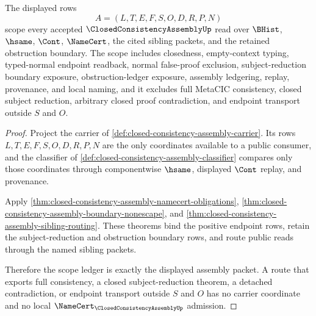 \begin{theorem}
\label{thm:closed-consistency-assembly-scope-ledger}
The displayed rows
$$
A=(L,T,E,F,S,O,D,R,P,N)
$$
scope every accepted $\ClosedConsistencyAssemblyUp$ read over $\BHist$, $\hsame$, $\Cont$, $\NameCert$, the cited sibling packets, and the retained obstruction boundary. The scope includes closedness, empty-context typing, typed-normal endpoint readback, normal false-proof exclusion, subject-reduction boundary exposure, obstruction-ledger exposure, assembly ledgering, replay, provenance, and local naming, and it excludes full MetaCIC consistency, closed subject reduction, arbitrary closed proof contradiction, and endpoint transport outside $S$ and $O$.
\end{theorem}
\begin{proof}
Project the carrier of \autoref{def:closed-consistency-assembly-carrier}. Its rows $L,T,E,F,S,O,D,R,P,N$ are the only coordinates available to a public consumer, and the classifier of \autoref{def:closed-consistency-assembly-classifier} compares only those coordinates through componentwise $\hsame$, displayed $\Cont$ replay, and provenance.

Apply \autoref{thm:closed-consistency-assembly-namecert-obligations}, \autoref{thm:closed-consistency-assembly-boundary-nonescape}, and \autoref{thm:closed-consistency-assembly-sibling-routing}. These theorems bind the positive endpoint rows, retain the subject-reduction and obstruction boundary rows, and route public reads through the named sibling packets.

Therefore the scope ledger is exactly the displayed assembly packet. A route that exports full consistency, a closed subject-reduction theorem, a detached contradiction, or endpoint transport outside $S$ and $O$ has no carrier coordinate and no local $\NameCert_{\ClosedConsistencyAssemblyUp}$ admission.
\end{proof}


\begin{closurestatus}{\ClosedConsistencyAssemblyUp}
  \theoryclosure{\publicClosure}
  \formalstatus{\unformalizedV}
\end{closurestatus}
